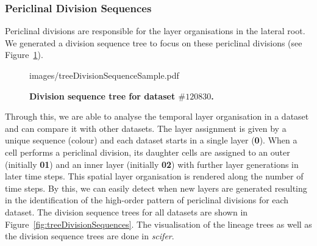 \documentclass[11pt,a4paper, draft]{article}
\begin{document}
\subsubsection{Periclinal Division Sequences}
\label{sec:treeDivisionSequence}
\noindent
Periclinal divisions are responsible for the layer organisations in the lateral root. We generated a division sequence tree to focus on these periclinal divisions (see Figure~\ref{fig:treeDivisionSequenceSample}).
%
\begin{figure}[htbp]
	\begin{center}
		\begin{overpic}[width=0.8\linewidth]{images/treeDivisionSequenceSample.pdf}
		\end{overpic}
\caption[Division sequence tree.]
{
{\bf Division sequence tree for dataset $\#120830$.}
}
	\label{fig:treeDivisionSequenceSample}
	\end{center}
\end{figure}
%
Through this, we are able to analyse the temporal layer organisation in a dataset and can compare it with other datasets. The layer assignment is given by a unique sequence (colour) and each dataset starts in a single layer (\textbf{0}). When a cell performs a periclinal division, its daughter cells are assigned to an outer (initially \textbf{01}) and an inner layer (initially \textbf{02}) with further layer generations in later time steps. This spatial layer organisation is rendered along the number of time steps. By this, we can easily detect when new layers are generated resulting in the identification of the high-order pattern of periclinal divisions for each dataset. The division sequence trees for all datasets are shown in Figure~\ref{fig:treeDivisionSequences}. The visualisation of the lineage trees as well as the division sequence trees are done in \textit{scifer}.
\end{document}
